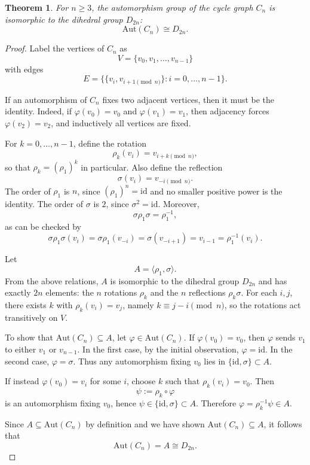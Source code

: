 \documentclass[12pt,a4paper,openany]{book}
\newtheorem{theorem}{Theorem}[section]
\begin{document}
\begin{theorem}
For $n \geq 3$, the automorphism group of the cycle graph $C_n$ is isomorphic to the dihedral group $D_{2n}$:
\[
\mathrm{Aut}(C_n) \cong D_{2n}.
\]
\end{theorem}

\begin{proof}
Label the vertices of $C_n$ as
\[
V = \{ v_0, v_1, \dots, v_{n-1} \}
\]
with edges
\[
E = \{ \{v_i, v_{i+1 \pmod n}\} : i = 0, \dots, n-1 \}.
\]

If an automorphism of $C_n$ fixes two adjacent vertices, then it must be the identity. Indeed, if $\varphi(v_0) = v_0$ and $\varphi(v_1) = v_1$, then adjacency forces $\varphi(v_2) = v_2$, and inductively all vertices are fixed.

For $k = 0, \dots, n-1$, define the rotation
\[
\rho_k(v_i) = v_{i+k \pmod n},
\]
so that $\rho_k = (\rho_1)^k$ in particular. Also define the reflection
\[
\sigma(v_i) = v_{-i \pmod n}.
\]
The order of $\rho_1$ is $n$, since $(\rho_1)^n = \mathrm{id}$ and no smaller positive power is the identity. The order of $\sigma$ is $2$, since $\sigma^2 = \mathrm{id}$. Moreover,
\[
\sigma \rho_1 \sigma = \rho_1^{-1},
\]
as can be checked by
\[
\sigma \rho_1 \sigma (v_i) 
= \sigma \rho_1 (v_{-i}) 
= \sigma(v_{-i+1}) 
= v_{i-1} = \rho_1^{-1}(v_i).
\]

Let
\[
A = \langle \rho_1, \sigma \rangle.
\]
From the above relations, $A$ is isomorphic to the dihedral group $D_{2n}$ and has exactly $2n$ elements: the $n$ rotations $\rho_k$ and the $n$ reflections $\rho_k \sigma$. For each $i,j$, there exists $k$ with $\rho_k(v_i) = v_j$, namely $k \equiv j-i \pmod n$, so the rotations act transitively on $V$.

To show that $\mathrm{Aut}(C_n) \subseteq A$, let $\varphi \in \mathrm{Aut}(C_n)$. If $\varphi(v_0) = v_0$, then $\varphi$ sends $v_1$ to either $v_1$ or $v_{n-1}$. In the first case, by the initial observation, $\varphi = \mathrm{id}$. In the second case, $\varphi = \sigma$. Thus any automorphism fixing $v_0$ lies in $\{\mathrm{id}, \sigma\} \subset A$.

If instead $\varphi(v_0) = v_i$ for some $i$, choose $k$ such that $\rho_k(v_i) = v_0$. Then
\[
\psi := \rho_k \circ \varphi
\]
is an automorphism fixing $v_0$, hence $\psi \in \{\mathrm{id}, \sigma\} \subset A$. Therefore $\varphi = \rho_k^{-1} \psi \in A$.

Since $A \subseteq \mathrm{Aut}(C_n)$ by definition and we have shown $\mathrm{Aut}(C_n) \subseteq A$, it follows that
\[
\mathrm{Aut}(C_n) = A \cong D_{2n}.
\]
\end{proof}
\end{document}
